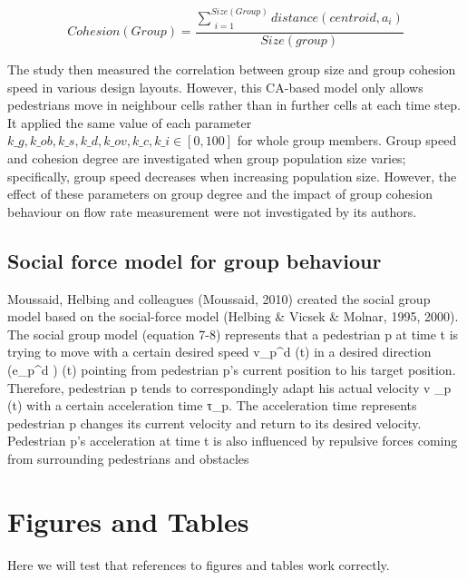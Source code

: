 \documentclass[a4paper,11pt,phdthesis,singlespace,twoside]{cssethesis}
\begin{document}
\begin{equation}
Cohesion(Group)= \frac{\sum_{\substack{i=1}}^{Size(Group)}distance(centroid,a_{i})}{Size(group)}
\end{equation}

The study then measured the correlation between group size and group cohesion speed in various design layouts. However, this CA-based model only allows pedestrians move in neighbour cells rather than in further cells at each time step. It applied the same value of each parameter \begin{math} \textit{k_{g}}, \textit{k_{ob}}, \textit{k_{s}},\textit{k_{d}},\textit{k_{ov}},\textit{k_{c}},\textit{k_{i}}  \in [0,100] \end{math} for whole group members. Group speed and cohesion degree are investigated when group population size varies; specifically, group speed decreases when increasing population size. However, the effect of these parameters on group degree and the impact of group cohesion behaviour on flow rate measurement were not investigated by its authors.

\section{Social force model for group behaviour}
Moussaid, Helbing and colleagues (Moussaid, 2010) created the social group model based on the social-force model (Helbing & Vicsek & Molnar, 1995, 2000). The social group model (equation 7-8) represents that a pedestrian p at time t is trying to move with a certain desired speed v_p^d (t) in a desired direction (e_p^d ) ⃗(t) pointing from pedestrian p’s current position to his target position. Therefore, pedestrian p tends to correspondingly adapt his actual velocity v ⃗_p (t) with a certain acceleration time τ_p. The acceleration time represents pedestrian p changes its current velocity and return to its desired velocity. Pedestrian p’s acceleration at time t is also influenced by repulsive forces coming from surrounding pedestrians and obstacles

\chapter{Figures and Tables}
Here we will test that references to figures and tables work correctly.
\end{document}
